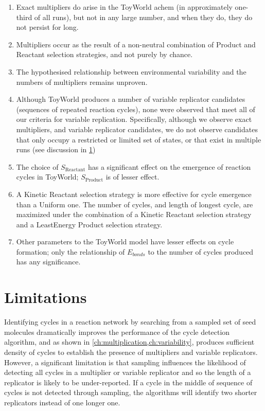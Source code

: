 \begin{enumerate}
\item Exact multipliers do arise in the ToyWorld \gls{achem} (in approximately one-third of all runs), but not in any large number, and when they do, they do not persist for long.
\item Multipliers occur as the result of a non-neutral combination of Product and Reactant selection strategies, and not purely by chance. 
\item The hypothesised relationship between environmental variability and the numbers of multipliers remains unproven. 
\item Although ToyWorld produces a number of variable replicator candidates (sequences of repeated reaction cycles), none were observed that meet all of our criteria for variable replication. Specifically, although we observe exact multipliers, and variable replicator candidates, we do not observe candidates that only occupy a restricted or limited set of states, or that exist in multiple runs (see discussion in \cref{sec:limitations})
\item The choice of $S_\mathrm{Reactant}$ has a significant effect on the emergence of reaction cycles in ToyWorld; $S_\mathrm{Product}$ is of lesser effect.
\item A Kinetic Reactant selection strategy is more effective for cycle emergence than a Uniform one. The number of cycles, and length of longest cycle, are maximized under the combination of a Kinetic Reactant selection strategy and a LeastEnergy Product selection strategy.
\item Other parameters to the ToyWorld model have lesser effects on cycle formation; only the relationship of $E_{bonds}$ to the number of cycles produced has any significance.
\end{enumerate}

\section{Limitations}\label{sec:limitations}

Identifying cycles in a reaction network by searching from a sampled set of seed molecules dramatically improves the performance of the cycle detection algorithm, and as shown in \cref{ch:multiplication,ch:variability}, produces sufficient density of cycles to establish the presence of multipliers and variable replicators. However, a significant limitation is that sampling influences the likelihood of detecting all cycles in a multiplier or variable replicator and so the length of a replicator is likely to be under-reported. If a cycle in the middle of sequence of cycles is not detected through sampling, the algorithms will identify two shorter replicators instead of one longer one. 


